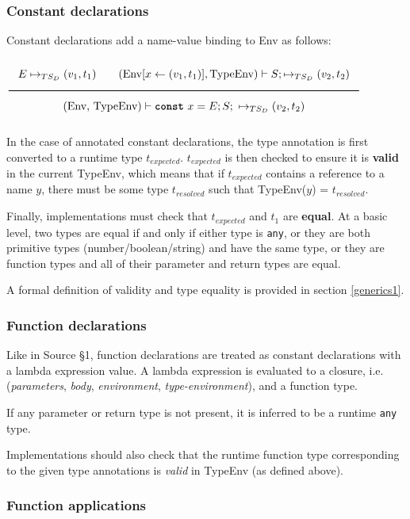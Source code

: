 \subsubsection*{Constant declarations}

Constant declarations add a name-value binding to Env as follows:

\begin{center}
$\Rule{E \Eval (v_1, t_1) \qquad (\textrm{Env}[x \leftarrow (v_1, t_1)], \textrm{TypeEnv}) \vdash S; \Eval (v_2, t_2)}{(\textrm{Env, TypeEnv}) \vdash \Const\ x = E; S;\ \Eval (v_2, t_2)}$
\end{center}

In the case of annotated constant declarations, the type annotation is first converted to a runtime type $t_{expected}$. 
$t_{expected}$ is then checked to ensure it is \textbf{valid} in the current TypeEnv, which means that if $t_{expected}$ contains a reference to a name $y$, there must be some type $t_{resolved}$ such that TypeEnv($y$) = $t_{resolved}$.

Finally, implementations must check that $t_{expected}$ and $t_1$ are \textbf{equal}.
At a basic level, two types are equal if and only if either type is \verb|any|, or they are both primitive types (number/boolean/string) and have the same type, or they are function types and all of their parameter and return types are equal.

A formal definition of validity and type equality is provided in section \ref{generics1}.


\subsubsection*{Function declarations}

Like in Source \S 1, function declarations are treated as constant declarations with a lambda expression value. A lambda expression is evaluated to a closure, i.e. (\textit{parameters}, \textit{body}, \textit{environment}, \textit{type-environment}), and a function type. 

If any parameter or return type is not present, it is inferred to be a runtime \verb|any| type.

Implementations should also check that the runtime function type corresponding to the given type annotations is \textit{valid} in TypeEnv (as defined above).



\subsubsection*{Function applications}

